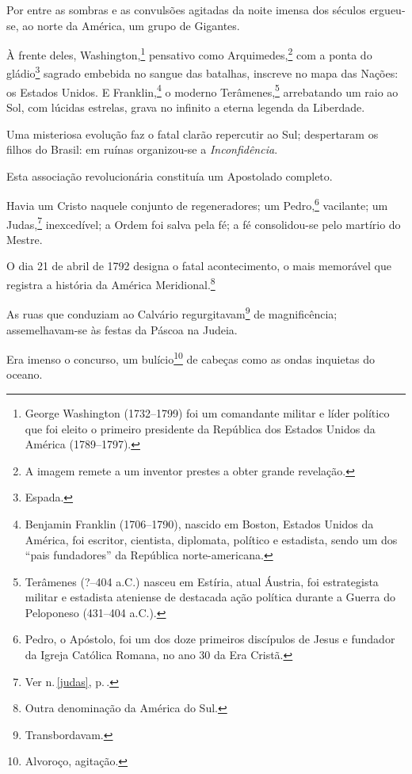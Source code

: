 {Por entre as sombras e as convulsões agitadas da noite imensa dos
séculos ergueu-se, ao norte da América, um grupo de Gigantes.

À frente deles, Washington,\footnote{George Washington (1732--1799) foi
  um comandante militar e líder político que foi eleito o primeiro
  presidente da República dos Estados Unidos da América (1789--1797).}
pensativo como Arquimedes,\footnote{A
  imagem remete a um inventor prestes a obter grande revelação.}
com a ponta do gládio\footnote{Espada.} sagrado embebida no sangue das
batalhas, inscreve no mapa das Nações: os Estados Unidos. E
Franklin,\footnote{Benjamin Franklin (1706--1790), nascido em Boston,
  Estados Unidos da América, foi escritor, cientista, diplomata,
  político e estadista, sendo um dos ``pais fundadores'' da República
  norte-americana.} o moderno Terâmenes,\footnote{Terâmenes (?--404
  a.C.) nasceu em Estíria, atual Áustria, foi estrategista militar e
  estadista ateniense de destacada ação política durante a Guerra do
  Peloponeso (431--404 a.C.).} arrebatando um raio ao Sol, com
lúcidas estrelas, grava no infinito a eterna legenda da Liberdade.

Uma misteriosa evolução faz o fatal clarão repercutir ao Sul;
despertaram os filhos do Brasil: em ruínas organizou-se a
\emph{Inconfidência}.

Esta associação revolucionária constituía um Apostolado completo.

Havia um Cristo naquele conjunto de regeneradores; um Pedro,\footnote{
  Pedro, o Apóstolo, foi um dos doze primeiros discípulos de Jesus e
  fundador da Igreja Católica Romana, no ano 30 da Era Cristã.}
vacilante; um Judas,\footnote{Ver n.\,\ref{judas}, p.\,\pageref{judas}.}
inexcedível; a Ordem foi salva pela fé; a fé consolidou-se pelo martírio
do Mestre.

O dia 21 de abril de 1792 designa o fatal acontecimento, o mais
memorável que registra a história da América Meridional.\footnote{
  Outra denominação da América do Sul.}

As ruas que conduziam ao Calvário regurgitavam\footnote{
  Transbordavam.} de magnificência; assemelhavam-se às festas da Páscoa
na Judeia.

Era imenso o concurso, um bulício\footnote{Alvoroço, agitação.} de
cabeças como as ondas inquietas do oceano.

}
